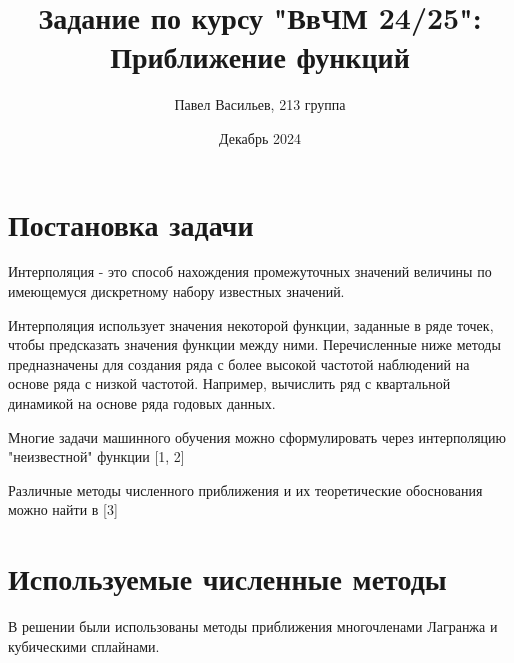 \documentclass{article}
\title{Задание по курсу "ВвЧМ 24/25": Приближение функций}
\author{Павел Васильев, 213 группа}
\date{Декабрь 2024}
\begin{document}
\maketitle

\section{Постановка задачи}
Интерполяция - это способ нахождения промежуточных значений величины по имеющемуся дискретному набору известных значений.

Интерполяция использует значения некоторой функции, заданные в ряде точек, чтобы предсказать значения функции между ними. Перечисленные ниже методы предназначены для создания ряда с более высокой частотой наблюдений на основе ряда с низкой частотой. Например, вычислить ряд с квартальной динамикой на основе ряда годовых данных.

Многие задачи машинного обучения можно сформулировать через интерполяцию "неизвестной" функции
[1, 2]

Различные методы численного приближения и их теоретические обоснования можно найти в [3]

\section{Используемые численные методы}
В решении были использованы методы приближения многочленами Лагранжа и кубическими сплайнами.
\end{document}
